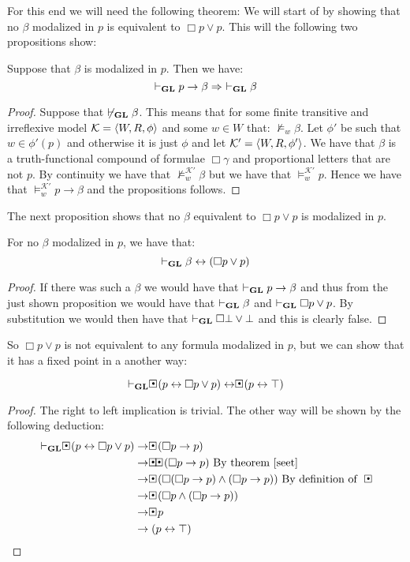\documentclass[../main.tex]{subfiles}
\begin{document}
For
this end we will need the following theorem:
We will start of by showing that no $\beta$ modalized in $p$ is equivalent to
$\Box p\vee p$. This will the following two propositions show:
\begin{prop}
	Suppose that $\beta$ is modalized in $p$. Then we have:
	\[\vdash_{\text{\textbf{GL}}} p\rightarrow\beta\Rightarrow\ \vdash_{\text{\textbf{GL}}}\beta\]
\end{prop}
\begin{proof}
	Suppose that $\not\vdash_{\text{\textbf{GL}}}\beta$. This means that for some finite
	transitive and irreflexive model $\mathcal{K}=\langle W,R,\phi\rangle$ and some $w\in W$ that:
	$\not\vDash_w\beta$. Let $\phi'$ be such that $w\in \phi'(p)$ and
	otherwise it is just $\phi$ and let $\mathcal{K}'=\langle W,R,\phi'\rangle$. We
	have that $\beta$ is a truth-functional compound of formulae
	$\Box\gamma$ and proportional letters that are not $p$. By continuity
	we have that $\not\vDash_w^{\mathcal{K}'}\beta$ but we have that
	$\vDash_w^{\mathcal{K}'}p$. Hence we have that
	$\vDash_w^{\mathcal{K}'}p\rightarrow\beta$ and the propositions follows.
\end{proof}
The next proposition shows that no $\beta$ equivalent to $\Box p\vee p$ is
modalized in $p$.
\begin{prop}
	For no $\beta$ modalized in $p$, we have that: 
	\[\vdash_{\text{\textbf{GL}}}\beta\leftrightarrow(\Box p\vee p)\]
\end{prop}
\begin{proof}
If there was such a $\beta$ we would have that $\vdash_{\text{\textbf{GL}}} p\rightarrow\beta$
and thus from the just shown proposition we would have that $\vdash_{\text{\textbf{GL}}}\beta$
and $\vdash_{\text{\textbf{GL}}}\Box p\vee p$. By substitution we would then have that
$\vdash_{\text{\textbf{GL}}}\Box\bot\vee\bot$ and this is clearly false.
\end{proof}
So $\Box p\vee p$ is not equivalent to any formula modalized in $p$, but we can
show that it has a fixed point in a another way:
\begin{prop}
	\[\vdash_\GL\sBox(p\leftrightarrow \Box p\vee
	p)\leftrightarrow\sBox(p\leftrightarrow\top)\]
\end{prop}
\begin{proof}
	The right to left implication is trivial. The other way will be shown
	by the following deduction:
	\begin{align*}
		\vdash_\GL\sBox(p\leftrightarrow\Box p\vee
		p)&\rightarrow\sBox(\Box p\rightarrow p)\\
		  &\rightarrow\sBox\sBox(\Box p\rightarrow p)\ \text{By
		  theorem \ref{seet}}\\
		  &\rightarrow\sBox (\Box(\Box p\rightarrow p)\wedge(\Box
		  p\rightarrow p))\ \text{By definition of}\ \sBox\\
		  &\rightarrow\sBox(\Box p\wedge(\Box p\rightarrow p))\\
		  &\rightarrow\sBox p\\
		  &\rightarrow (p\leftrightarrow \top)
	\end{align*}
\end{proof}
\end{document}
